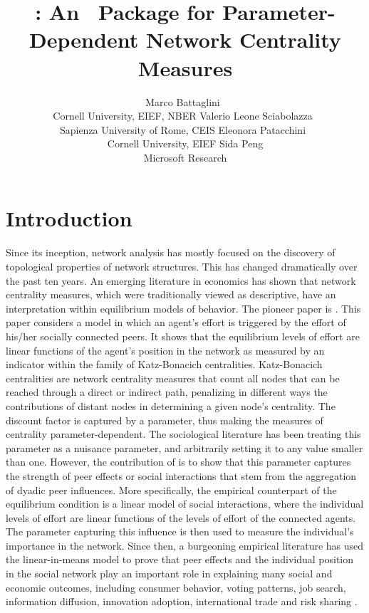\documentclass[nojss]{jss}
\author{Marco Battaglini~\orcidlink{0000-0001-9690-0721}\\Cornell University, EIEF, NBER
  \And Valerio Leone Sciabolazza~\orcidlink{0000-0003-2537-3084}\\Sapienza University of Rome, CEIS
  \AND Eleonora Patacchini~\orcidlink{0000-0002-3510-2969}\\ Cornell University, EIEF
  \And Sida Peng\\Microsoft Research}
\title{\pkg{econet}: An \proglang{R}~Package for Parameter-Dependent Network Centrality Measures}
\begin{document}
\vspace*{-0.5cm}

\section{Introduction} \label{sec:intro}

Since its inception, network analysis has mostly focused on the discovery of
topological properties of network structures.  This has changed dramatically
over the past ten years.  An emerging literature in economics has shown that
network centrality measures, which were traditionally viewed as descriptive,
have an interpretation within equilibrium models of behavior.  The pioneer
paper is \cite{Ballester+Armengol+Zenou:2006}.  This paper considers a model
in which an agent's effort is triggered by the effort of his/her socially
connected peers.  It shows that the equilibrium  levels of effort are linear
functions of the agent's position in the network as measured by an indicator
within the family of Katz-Bonacich centralities.  Katz-Bonacich centralities
\citep{Katz:1953,Bonacich:1972,Bonacich:1987} are network centrality
measures that count all nodes that can be reached through a direct or
indirect path, penalizing in different ways the contributions of distant
nodes in determining a given node's centrality.  The discount factor is
captured by a parameter, thus making the measures of centrality
parameter-dependent.  The sociological literature has been treating this
parameter as a nuisance parameter, and arbitrarily setting it to any value
smaller than one.  However, the contribution of
\cite{Ballester+Armengol+Zenou:2006} is to show that this parameter captures
the strength of peer effects or social interactions that stem from the
aggregation of dyadic peer influences.  More specifically, the empirical
counterpart of the \cite{Ballester+Armengol+Zenou:2006} equilibrium
condition is a linear model of social interactions, where the individual
levels of effort are linear functions of the levels of effort of the
connected agents.  The parameter capturing this influence is then used to
measure the individual's importance in the network.  Since then, a
burgeoning empirical literature has used the linear-in-means model to prove
that peer effects and the individual position in the social network play an
important role in explaining many social and economic outcomes, including
consumer behavior, voting patterns, job search, information diffusion,
innovation adoption, international trade and risk sharing \citep[see
e.g.,][for recent
reviews]{An:2011,An:2015a,Jackson+Rogers+Zenou:2017,Hsieh:2020,Zenou:2016}.
\end{document}
